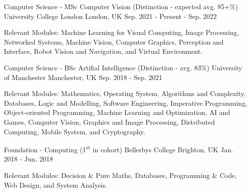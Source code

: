 

\begin{cventries}

  \cventry
    {Computer Science - MSc Computer Vision (Distinction - expected avg. 85+\%)} %
    {University College London} %
    {London, UK} %
    {Sep. 2021 - Present - Sep. 2022} %
    {
      \begin{cvitems} %
        \item {Relevant Modules: Machine Learning for Visual Computing, Image Processing, Networked Systems, Machine Vision, Computer Graphics, Perception and Interface, Robot Vision and Navigation, and Virtual Environment.}
      \end{cvitems}
    }
    
  \cventry
    {Computer Science - BSc Artifial Intelligence (Distinction - avg. 83\%)} %
    {University of Manchester} %
    {Manchester, UK} %
    {Sep. 2018 - Sep. 2021} %
    {
      \begin{cvitems} %
        \item {Relevant Modules: Mathematics, Operating System, Algorithms and Complexity, Databases, Logic and Modelling, Software Engineering, Imperative Programming, Object-oriented Programming, Machine Learning and Optimization, AI and Games,  Computer Vision, Graphics and Image Processing, Distributed Computing, Mobile System, and Cryptography.}
      \end{cvitems}
    }
    
    \cventry
    {Foundation - Computing (1\textsuperscript{st} in cohort)} %
    {Bellerbys College} %
    {Brighton, UK} %
    {Jan. 2018 - Jun. 2018} %
    {
     \begin{cvitems} %
        \item {Relevant Modules: Decision \& Pure Maths, Databases, Programming \& Code, Web Design, and System Analysis.}
      \end{cvitems}
    }
    

\end{cventries}
